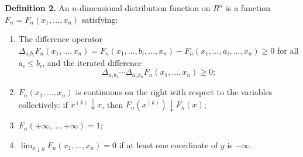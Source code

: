 \textbf{Definition 2.} An $n$-dimensional distribution function on $R^n$ is a function $F_n = F_n(x_1, \ldots, x_n)$ satisfying:

\begin{enumerate}
\item[(i)] The difference operator $\Delta_{a_i b_i} F_n(x_1, \ldots, x_n) = F_n(x_1, \ldots, b_i, \ldots, x_n) - F_n(x_1, \ldots, a_i, \ldots, x_n) \geq 0$ for all $a_i \leq b_i$, and the iterated difference
$$\Delta_{a_1 b_1} \cdots \Delta_{a_n b_n} F_n(x_1, \ldots, x_n) \geq 0;$$

\item[(ii)] $F_n(x_1, \ldots, x_n)$ is continuous on the right with respect to the variables collectively: if $x^{(k)} \downarrow x$, then $F_n(x^{(k)}) \downarrow F_n(x)$;

\item[(iii)] $F_n(+\infty, \ldots, +\infty) = 1$;

\item[(iv)] $\lim_{x \downarrow y} F_n(x_1, \ldots, x_n) = 0$ if at least one coordinate of $y$ is $-\infty$.
\end{enumerate}
